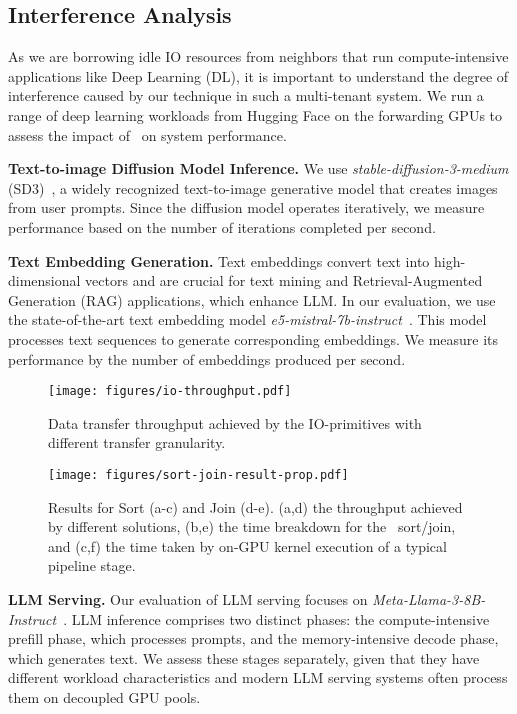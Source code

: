 \subsection{Interference Analysis}
As we are borrowing idle IO resources from neighbors that run compute-intensive applications like Deep Learning (DL), it is important to understand the degree of interference caused by our technique in such a multi-tenant system.
We run a range of deep learning workloads from Hugging Face on the forwarding GPUs to assess the impact of \THISWORK\ on system performance.

\noindent
\textbf{Text-to-image Diffusion Model Inference.} 
We use \textit{stable-diffusion-3-medium} (SD3)~\cite{stable-diffusion}, a widely recognized text-to-image generative model that creates images from user prompts. 
Since the diffusion model operates iteratively, we measure performance based on the number of iterations completed per second.

\noindent
\textbf{Text Embedding Generation.}
Text embeddings convert text into high-dimensional vectors and are crucial for text mining and Retrieval-Augmented Generation (RAG) applications, which enhance LLM.
In our evaluation, we use the state-of-the-art text embedding model \textit{e5-mistral-7b-instruct}~\cite{wang2022text, wang2024improving}. 
This model processes text sequences to generate corresponding embeddings. 
We measure its performance by the number of embeddings produced per second.

\begin{figure*}[t]
\centerline{\texttt{[image: figures/io-throughput.pdf]}}
\caption{Data transfer throughput achieved by the IO-primitives with different transfer granularity.}
\label{fig:io-bandwidth}
\end{figure*}

\begin{figure*}[t]
    \centering
    \texttt{[image: figures/sort-join-result-prop.pdf]}
    \caption{Results for Sort (a-c) and Join (d-e). (a,d) the throughput achieved by different solutions, (b,e) the time breakdown for the \THISWORK\ sort/join, and (c,f) the time taken by on-GPU kernel execution of a typical pipeline stage.}
    \label{fig:sort-perf}
    
\end{figure*}



\noindent
\textbf{LLM Serving.}
Our evaluation of LLM serving focuses on \textit{Meta-Llama-3-8B-Instruct}~\cite{llama3modelcard}. 
LLM inference comprises two distinct phases: the compute-intensive prefill phase, which processes prompts, and the memory-intensive decode phase, which generates text. 
We assess these stages separately, given that they have different workload characteristics and modern LLM serving systems often process them on decoupled GPU pools. 


